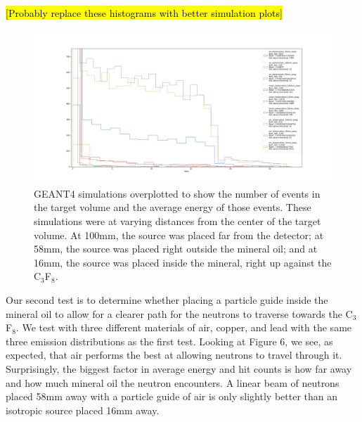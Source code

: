 \documentclass[%
12pt,
twoside,
reprint,
amsmath,amssymb,
aps,
]{article}
\begin{document}
	\hl{[Probably replace these histograms with better simulation plots]}
	\begin{figure}[H]
		\includegraphics[scale = 0.45, center]{Images/histogramtot_distancetest_threshold_count.png}
		\caption{\label{tab:table-name} GEANT4 simulations overplotted to show the number of events in the target volume and the average energy of those events. These simulations were at varying distances from the center of the target volume. At 100mm, the source was placed far from the detector; at 58mm, the source was placed right outside the mineral oil; and at 16mm, the source was placed inside the mineral, right up against the C$_{3}$F$_{8}$.}
	\end{figure}

	\par Our second test is to determine whether placing a particle guide inside the mineral oil to allow for a clearer path for the neutrons to traverse towards the C$_{3}$F$_{8}$. We test with three different materials of air, copper, and lead with the same three emission distributions as the first test. Looking at Figure 6, we see, as expected, that air performs the best at allowing neutrons to travel through it. Surprisingly, the biggest factor in average energy and hit counts is how far away and how much mineral oil the neutron encounters. A linear beam of neutrons placed 58mm away with a particle guide of air is only slightly better than an isotropic source placed 16mm away.
\end{document}
